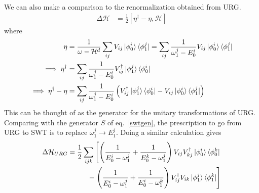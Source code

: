 We can also make a comparison to the renormalization obtained from URG.
\begin{equation}\begin{aligned}
	\Delta \mathcal{H} &= \frac{1}{2}\left[\eta^\dagger - \eta,\mathcal{H}\right]
\end{aligned}\end{equation}
where 
\begin{equation}\begin{aligned}
\eta &= \frac{1}{\omega - \mathcal{H}^d}\sum_{ij}V_{ij}\ket{\phi_0^i}\bra{\phi_1^j} = \sum_{ij}\frac{1}{\omega_1^j - E_0^i}V_{ij}\ket{\phi_0^i}\bra{\phi_1^j}\\
\implies \eta^\dagger &= \sum_{ij}\frac{1}{\omega_1^j - E_0^i}V^\dagger_{ij}\ket{\phi_1^j}\bra{\phi_0^i}\\
\implies \eta^\dagger - \eta &= \sum_{ij}\frac{1}{\omega_1^j - E_0^i}\left(V^\dagger_{ij}\ket{\phi_1^j}\bra{\phi_0^i} - V_{ij}\ket{\phi_0^i}\bra{\phi_1^j}\right)\\
\end{aligned}\end{equation}
This can be thought of as the generator for the unitary transformations of URG. Comparing with the generator \(S\) of eq.~\ref{swtgen}, the prescription to go from URG to SWT is to replace \(\omega_1^j \to E_1^j\). Doing a similar calculation gives
\begin{equation}\begin{aligned}
	\Delta \mathcal{H}_{URG} = \frac{1}{2} \sum_{ijk}\left[\left(\frac{1}{E_0^i - \omega_1^j} + \frac{1}{E_0^k - \omega_1^j}\right)V_{ij}V^\dagger_{kj}\ket{\phi_0^i}\bra{\phi_0^k}\right.\\
	- \left.\left(\frac{1}{E_0^i - \omega_1^j} + \frac{1}{E_0^i - \omega_1^k}\right)V^\dagger_{ij}V_{ik}\ket{\phi_1^j}\bra{\phi_1^k}\right]\\
\end{aligned}\end{equation}

